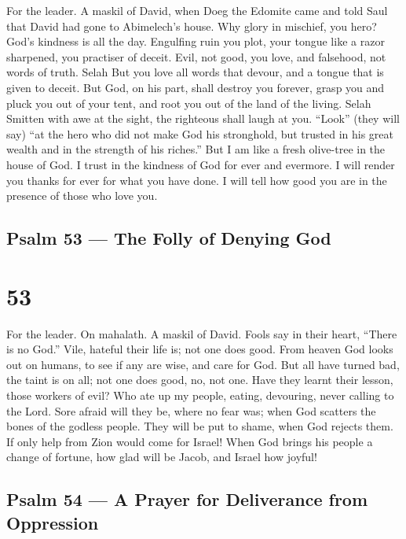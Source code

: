 For the leader. A maskil of David, when Doeg the Edomite came and told
Saul that David had gone to Abimelech's house.  Why glory in
mischief, you hero? God's kindness is all the day. 
Engulfing ruin you plot, your tongue like a razor sharpened, you
practiser of deceit.  Evil, not good, you love, and
falsehood, not words of truth. Selah  But you love all words
that devour, and a tongue that is given to deceit.  But God,
on his part, shall destroy you forever, grasp you and pluck you out of
your tent, and root you out of the land of the living. Selah
 Smitten with awe at the sight, the righteous shall laugh at
you.  ``Look'' (they will say) ``at the hero who did not
make God his stronghold, but trusted in his great wealth and in the
strength of his riches.''  But I am like a fresh olive-tree
in the house of God. I trust in the kindness of God for ever and
evermore.  I will render you thanks for ever for what you
have done. I will tell how good you are in the presence of those who
love you.

\hypertarget{psalm-53-the-folly-of-denying-god}{%
\subsection{Psalm 53 --- The Folly of Denying
God}\label{psalm-53-the-folly-of-denying-god}}

\hypertarget{section-52}{%
\section{53}\label{section-52}}

For the leader. On mahalath. A maskil of David.  Fools say
in their heart, ``There is no God.'' Vile, hateful their life is; not
one does good.  From heaven God looks out on humans, to see
if any are wise, and care for God.  But all have turned bad,
the taint is on all; not one does good, no, not one.  Have
they learnt their lesson, those workers of evil? Who ate up my people,
eating, devouring, never calling to the Lord.  Sore afraid
will they be, where no fear was; when God scatters the bones of the
godless people. They will be put to shame, when God rejects them.
 If only help from Zion would come for Israel! When God
brings his people a change of fortune, how glad will be Jacob, and
Israel how joyful!

\hypertarget{psalm-54-a-prayer-for-deliverance-from-oppression}{%
\subsection{Psalm 54 --- A Prayer for Deliverance from
Oppression}\label{psalm-54-a-prayer-for-deliverance-from-oppression}}

